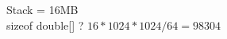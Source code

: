 \documentclass{article}
\begin{document}
\noindent Stack = 16MB\\
sizeof double[] ? $16 * 1024 * 1024 / 64 = 98304$
\end{document}
